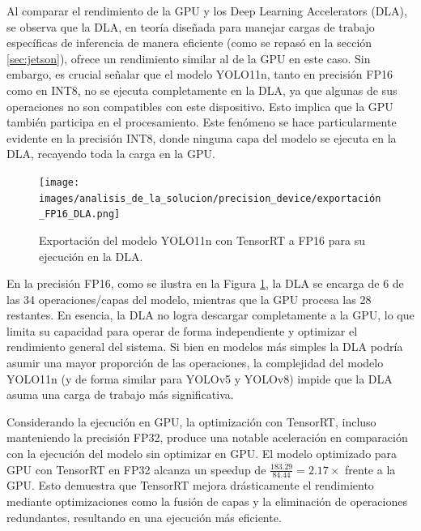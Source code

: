 \documentclass[11pt,spanish,listoffigures,listoftables]{tfgetsinf}
\begin{document}
Al comparar el rendimiento de la GPU y los Deep Learning Accelerators (DLA), se observa que la DLA, en teoría diseñada para manejar cargas de trabajo específicas de inferencia de manera eficiente (como se repasó en la sección \ref{sec:jetson}), ofrece un rendimiento similar al de la GPU en este caso. Sin embargo, es crucial señalar que el modelo YOLO11n, tanto en precisión FP16 como en INT8, no se ejecuta completamente en la DLA, ya que algunas de sus operaciones no son compatibles con este dispositivo. Esto implica que la GPU también participa en el procesamiento. Este fenómeno se hace particularmente evidente en la precisión INT8, donde ninguna capa del modelo se ejecuta en la DLA, recayendo toda la carga en la GPU.
\begin{figure}[H]
   \centering
   \texttt{[image: images/analisis\_de\_la\_solucion/precision\_device/exportación\_FP16\_DLA.png]}
   \caption{Exportación del modelo YOLO11n con TensorRT a FP16 para su ejecución en la DLA.}
   \label{fig:exportacion_FP16_DLA}
\end{figure}
En la precisión FP16, como se ilustra en la Figura \ref{fig:exportacion_FP16_DLA}, la DLA se encarga de 6 de las 34 operaciones/capas del modelo, mientras que la GPU procesa las 28 restantes. En esencia, la DLA no logra descargar completamente a la GPU, lo que limita su capacidad para operar de forma independiente y optimizar el rendimiento general del sistema. Si bien en modelos más simples la DLA podría asumir una mayor proporción de las operaciones, la complejidad del modelo YOLO11n (y de forma similar para YOLOv5 y YOLOv8) impide que la DLA asuma una carga de trabajo más significativa.

Considerando la ejecución en GPU, la optimización con TensorRT, incluso manteniendo la precisión FP32, produce una notable aceleración en comparación con la ejecución del modelo sin optimizar en GPU. El modelo optimizado para GPU con TensorRT en FP32 alcanza un speedup de $\frac{183.29}{84.44} = 2.17\times$ frente a la GPU. Esto demuestra que TensorRT mejora drásticamente el rendimiento mediante optimizaciones como la fusión de capas y la eliminación de operaciones redundantes, resultando en una ejecución más eficiente.
\end{document}
